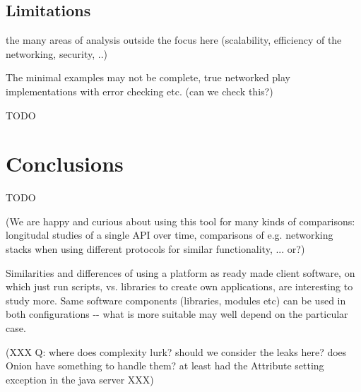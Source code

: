 \documentclass[conference]{IEEEtran}
\begin{document}
\subsection{Limitations%
  \label{limitations}%
}

the many areas of analysis outside the focus here (scalability,
efficiency of the networking, security, ..)

The minimal examples may not be complete, true networked play
implementations with error checking etc. (can we check this?)

TODO


\section{Conclusions%
  \label{conclusions}%
}

TODO

(We are happy and curious about using this tool for many kinds of
comparisons: longitudal studies of a single API over time, comparisons
of e.g. networking stacks when using different protocols for similar
functionality, ... or?)

Similarities and differences of using a platform as ready made client
software, on which just run scripts, vs. libraries to create own
applications, are interesting to study more. Same software components
(libraries, modules etc) can be used in both configurations -{}- what is
more suitable may well depend on the particular case.

(XXX Q: where does complexity lurk? should we consider the leaks here?
does Onion have something to handle them? at least had the Attribute
setting exception in the java server XXX)
\end{document}
